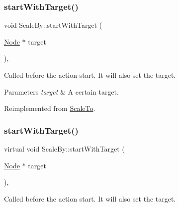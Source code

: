 \mbox{\label{classScaleBy_a1212167a4e86b3a8087e72602698d50e}} 
\subsubsection{\texorpdfstring{start\+With\+Target()}{startWithTarget()}\hspace{0.1cm}{\footnotesize\ttfamily [1/2]}}
{\footnotesize\ttfamily void Scale\+By\+::start\+With\+Target (\begin{DoxyParamCaption}\item[{\hyperlink{classNode}{Node} $\ast$}]{target }\end{DoxyParamCaption})\hspace{0.3cm}{\ttfamily [override]}, {\ttfamily [virtual]}}

Called before the action start. It will also set the target.


\begin{DoxyParams}{Parameters}
{\em target} & A certain target. \\
\hline
\end{DoxyParams}


Reimplemented from \hyperlink{classScaleTo_a2591cf6fc3d966d7799bac46acce04d7}{Scale\+To}.

\mbox{\label{classScaleBy_a161a68e7e1e9278f6f937d67cc3d27b1}} 
\subsubsection{\texorpdfstring{start\+With\+Target()}{startWithTarget()}\hspace{0.1cm}{\footnotesize\ttfamily [2/2]}}
{\footnotesize\ttfamily virtual void Scale\+By\+::start\+With\+Target (\begin{DoxyParamCaption}\item[{\hyperlink{classNode}{Node} $\ast$}]{target }\end{DoxyParamCaption})\hspace{0.3cm}{\ttfamily [override]}, {\ttfamily [virtual]}}

Called before the action start. It will also set the target.


